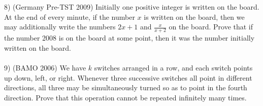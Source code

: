 \documentclass{article}
\begin{document}
\\
\\
8) (Germany Pre-TST 2009) Initially one positive integer is written on the board. At the end of every minute, if the number $x$ is written on the board, then we may additionally write the numbers $2x+1$ and $\frac{x}{x+2}$ on the board. Prove that if the number 2008 is on the board at some point, then it was the number initially written on the board.
\\
\\
9) (BAMO 2006) We have $k$ switches arranged in a row, and each switch points up down, left, or right. Whenever three successive switches all point in different directions, all three may be simultaneously turned so as to point in the fourth direction. Prove that this operation cannot be repeated infinitely many times.
\end{document}
